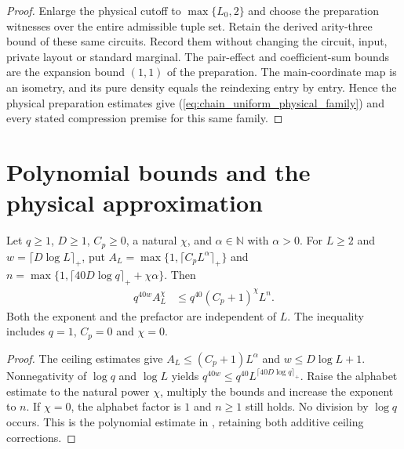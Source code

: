 \begin{proof}\leanok
    Enlarge the physical cutoff to $\max\{L_0,2\}$ and choose the
    preparation witnesses over the entire admissible tuple set.
    Retain the derived arity-three bound of these same circuits.
    Record them without changing the circuit, input, private layout
    or standard marginal. The pair-effect and coefficient-sum bounds
    are the expansion bound $(1,1)$ of the preparation. The main-coordinate map is an isometry,
    and its pure density equals the reindexing entry by entry.
    Hence the physical preparation estimates give
    (\ref{eq:chain_uniform_physical_family}) and every stated
    compression premise for this same family.
\end{proof}

\section{Polynomial bounds and the physical approximation}

\begin{lemma}
    \label{thm:chain_protocol_polynomial_bond}
    \leanok
    Let $q\ge1$, $D\ge1$, $C_p\ge0$, a natural $\chi$, and $\alpha\in\mathbb N$
    with $\alpha>0$. For $L\ge2$ and $w=\lceil D\log L\rceil_+$,
    put $A_L=\max\{1,\lceil C_pL^\alpha\rceil_+\}$ and
    $n=\max\{1,\lceil40D\log q\rceil_++\chi\alpha\}$.
    Then
    \begin{align}
        q^{40w}A_L^{\chi}
         & \le q^{40}(C_p+1)^{\chi}L^n.
        \label{eq:chain_protocol_polynomial_bond}
    \end{align}
    Both the exponent and the prefactor are independent of $L$.
    The inequality includes $q=1$, $C_p=0$ and $\chi=0$.
\end{lemma}
\begin{proof}\leanok
    The ceiling estimates give
    $A_L\le(C_p+1)L^\alpha$ and
    $w\le D\log L+1$.
    Nonnegativity of $\log q$ and $\log L$ yields
    $q^{40w}\le q^{40}L^{\lceil40D\log q\rceil_+}$.
    Raise the alphabet estimate to the natural power $\chi$,
    multiply the bounds and increase the exponent to $n$.
    If $\chi=0$, the alphabet factor is $1$ and $n\ge1$ still holds.
    No division by $\log q$ occurs. This is the polynomial estimate
    in \cite[Part~II, end of the proof of Theorem~B]{TNLean2026OneDimensional},
    retaining both additive ceiling corrections.
\end{proof}

